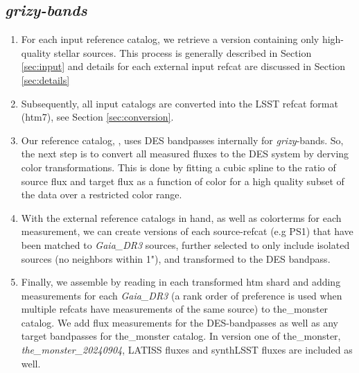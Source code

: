 \subsection{\textit{grizy-bands}}
\begin{enumerate}
    \item For each input reference catalog, we retrieve a version containing only high-quality stellar sources. This process is generally described in Section \ref{sec:input} and details for each external input refcat are discussed in Section \ref{sec:details}
    \item Subsequently, all input catalogs are converted into the LSST refcat format (htm7), see Section \ref{sec:conversion}.
    \item Our reference catalog, \monster, uses DES bandpasses internally for \textit{grizy}-bands. So, the next step is to convert all measured fluxes to the DES system by derving color transformations. 
    This is done by fitting a cubic spline to the ratio of source flux and target flux as a function of color for a high quality subset of the data over a restricted color range.
    \item With the external reference catalogs in hand, as well as colorterms for each measurement, we can create versions of each source-refcat (e.g PS1) that have been matched to \textit{Gaia\_DR3} sources, further selected to only include isolated sources (no neighbors within 1"), and transformed to the DES bandpass.
    \item Finally, we assemble \monster by reading in each transformed htm shard and adding measurements for each \textit{Gaia\_DR3} (a rank order of preference is used when multiple refcats have measurements of the same source) to the\_monster catalog. 
    We add flux measurements for the DES-bandpasses as well as any target bandpasses for the\_monster catalog. In version one of the\_monster, \textit{the\_monster\_20240904}, LATISS fluxes and synthLSST fluxes are included as well.
\end{enumerate}

